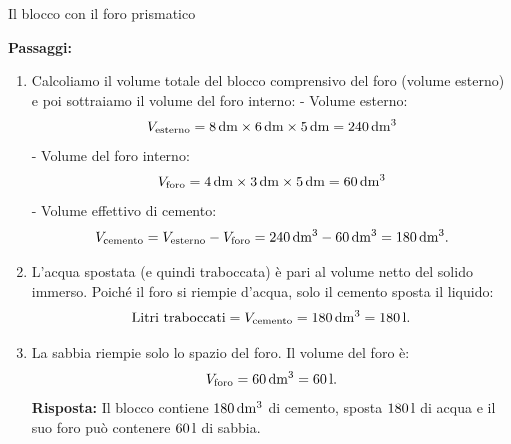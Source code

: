 \begin{esercizio}{Il blocco con il foro prismatico}
\begin{soluzione}
  \textbf{Passaggi:}
  \begin{enumerate}[label=\alph*)]
    \item Calcoliamo il volume totale del blocco comprensivo del foro (volume esterno) e poi sottraiamo il volume del foro interno:
    - Volume esterno:
    \[
    V_{\text{esterno}} = 8\,\mathrm{dm} \times 6\,\mathrm{dm} \times 5\,\mathrm{dm} = 240\,\mathrm{dm^3}
    \]
    - Volume del foro interno:
    \[
    V_{\text{foro}} = 4\,\mathrm{dm} \times 3\,\mathrm{dm} \times 5\,\mathrm{dm} = 60\,\mathrm{dm^3}
    \]
    - Volume effettivo di cemento:
    \[
    V_{\text{cemento}} = V_{\text{esterno}} - V_{\text{foro}} = 240\,\mathrm{dm^3} - 60\,\mathrm{dm^3} = 180\,\mathrm{dm^3}.
    \]
    \item L'acqua spostata (e quindi traboccata) è pari al volume netto del solido immerso. Poiché il foro si riempie d'acqua, solo il cemento sposta il liquido:
    \[
    \text{Litri traboccati} = V_{\text{cemento}} = 180\,\mathrm{dm^3} = 180\,\mathrm{l}.
    \]
    \item La sabbia riempie solo lo spazio del foro. Il volume del foro è:
    \[
    V_{\text{foro}} = 60\,\mathrm{dm^3} = 60\,\mathrm{l}.
    \]
    \textbf{Risposta:} Il blocco contiene $180\,\mathrm{dm^3}$ di cemento, sposta $180\,\mathrm{l}$ di acqua e il suo foro può contenere $60\,\mathrm{l}$ di sabbia.
  \end{enumerate}
\end{soluzione}
\end{esercizio}

\condnewpage


